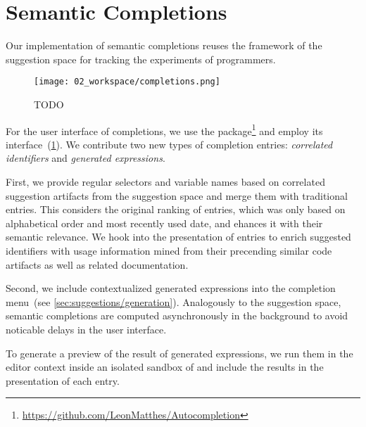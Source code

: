 
\section{Semantic Completions}
\label{sec:implementation/completions}

Our implementation of semantic completions reuses the framework of the suggestion space for tracking the experiments of programmers.

\begin{figure}
	\centering
	\texttt{[image: 02\_workspace/completions.png]}
	\caption[TODO]{
		TODO
	}
	\label{fig:implementation/completions}
\end{figure}

For the user interface of completions, we use the  package\footnote{\url{https://github.com/LeonMatthes/Autocompletion}} and employ its  interface~(\cref{fig:implementation/completions}).
We contribute two new types of completion entries: \emph{correlated identifiers} and \emph{generated expressions}.

First, we provide regular selectors and variable names based on correlated suggestion artifacts from the suggestion space and merge them with traditional  entries.
This considers the original ranking of entries, which was only based on alphabetical order and most recently used date, and ehances it with their semantic relevance.
We hook into the presentation of entries to enrich suggested identifiers with usage information mined from their precending similar code artifacts as well as related documentation.

Second, we include contextualized generated expressions into the completion menu~(see \cref{sec:suggestions/generation}).
Analogously to the suggestion space, semantic completions are computed asynchronously in the background to avoid noticable delays in the user interface.

To generate a preview of the result of generated expressions, we run them in the editor context inside an isolated sandbox of  and include the results in the presentation of each entry.
